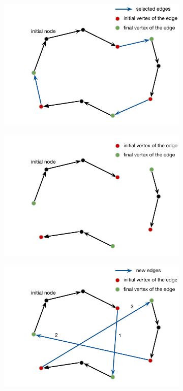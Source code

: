 \begin{figure}[h!]
  \centering
  \begin{subfigure}[b]{0.49\linewidth}
    \includegraphics[width=\linewidth]{media/vnss12.pdf}
     \caption{}
  \end{subfigure}
  \begin{subfigure}[b]{0.49\linewidth}
    \includegraphics[width=\linewidth]{media/vnss22.pdf}
    \caption{}
  \end{subfigure}
  \begin{subfigure}[b]{0.49\linewidth}
    \includegraphics[width=\linewidth]{media/vnss32.pdf}

\end{subfigure}
\end{figure}
